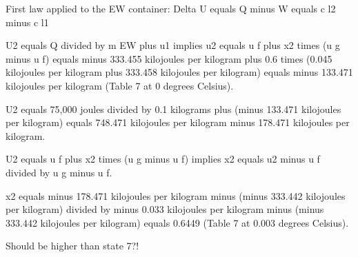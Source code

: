 First law applied to the EW container:  
Delta U equals Q minus W equals c l2 minus c l1  

U2 equals Q divided by m EW plus u1 implies u2 equals u f plus x2 times (u g minus u f) equals minus 333.455 kilojoules per kilogram plus 0.6 times (0.045 kilojoules per kilogram plus 333.458 kilojoules per kilogram) equals minus 133.471 kilojoules per kilogram (Table 7 at 0 degrees Celsius).  

U2 equals 75,000 joules divided by 0.1 kilograms plus (minus 133.471 kilojoules per kilogram) equals 748.471 kilojoules per kilogram minus 178.471 kilojoules per kilogram.  

U2 equals u f plus x2 times (u g minus u f) implies x2 equals u2 minus u f divided by u g minus u f.  

x2 equals minus 178.471 kilojoules per kilogram minus (minus 333.442 kilojoules per kilogram) divided by minus 0.033 kilojoules per kilogram minus (minus 333.442 kilojoules per kilogram) equals 0.6449 (Table 7 at 0.003 degrees Celsius).  

Should be higher than state 7?!